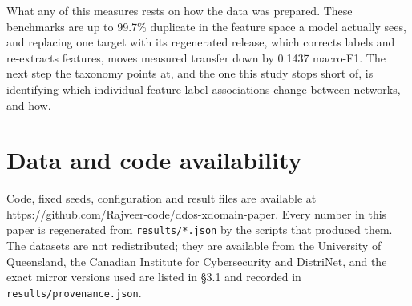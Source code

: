 \documentclass[journal]{IEEEtran}
\begin{document}
What any of this measures rests on how the data was prepared. These benchmarks are up to 99.7\% duplicate in the feature space a model actually sees, and replacing one target with its regenerated release, which corrects labels and re-extracts features, moves measured transfer down by 0.1437 macro-F1. The next step the taxonomy points at, and the one this study stops short of, is identifying which individual feature-label associations change between networks, and how.


\section*{Data and code availability}

Code, fixed seeds, configuration and result files are available at https://github.com/Rajveer-code/ddos-xdomain-paper. Every number in this paper is regenerated from \texttt{results/*.json} by the scripts that produced them. The datasets are not redistributed; they are available from the University of Queensland, the Canadian Institute for Cybersecurity and DistriNet, and the exact mirror versions used are listed in §3.1 and recorded in \texttt{results/provenance.json}.
\end{document}
